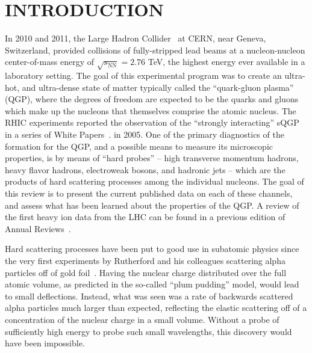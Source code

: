 \section{INTRODUCTION}
\label{introduction}

In 2010 and 2011, the Large Hadron Collider~\cite{Evans:2008zzb} at CERN, 
near Geneva, Switzerland, provided collisions of
fully-stripped lead beams at a nucleon-nucleon center-of-mass energy of $\sqrt{s_{\mathrm{NN}}}=2.76$ TeV,
the highest energy ever available in a laboratory setting.  
The goal of this experimental program was to create an ultra-hot, and ultra-dense state 
of matter typically called the ``quark-gluon plasma'' (QGP), where the degrees of freedom are expected to be the 
quarks and gluons which make up the nucleons that themselves comprise the atomic nucleus.
The RHIC experiments reported the observation of the ``strongly interacting'' sQGP in a series of 
White Papers~\cite{Adams:2005dq,Arsene:2004fa,Back:2004je,Adcox:2004mh}.
in 2005. 
One of the primary diagnostics of the formation for the QGP, and a possible means to measure its microscopic
properties, is by means of ``hard probes'' -- high transverse momentum hadrons, heavy flavor hadrons,
electroweak bosons, and hadronic jets -- which are the products of hard scattering processes among the
individual nucleons.  
The goal of this review is to present the current published data on each of these channels, and assess
what has been learned about the properties of the QGP.
A review of the first heavy ion data from the LHC can be found in a 
previous edition of Annual Reviews~\cite{Muller:2012zq}.

Hard scattering processes have been put to good use in subatomic physics since the
very first experiments by Rutherford and his colleagues scattering alpha particles off of gold foil~\cite{Rutherford}.
Having the nuclear charge distributed over the full atomic volume, as predicted in the so-called
``plum pudding'' model, would lead to small deflections.  Instead, what was seen was a rate of
backwards scattered alpha particles much larger than expected, reflecting the elastic scattering off
of a concentration of the nuclear charge in a small volume.  
Without a probe of sufficiently high energy to probe such small wavelengths, this discovery would 
have been impossible.  

